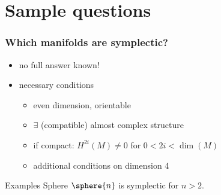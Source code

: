\section{Sample questions}

\begin{frame}
  \frametitle{Which manifolds are symplectic?}
  \begin{itemize}
    \item no full answer known! %
    \item necessary conditions
    \begin{itemize}
      \item even dimension, orientable %
      \item $\exists$ (compatible) almost complex structure
      \item if compact: $H^{2i}(M)\neq 0$ for $0 < 2i < \dim(M)$
      \item additional conditions on dimension 4 %
    \end{itemize}
  \end{itemize}
  \begin{block}{Examples}
    Sphere $\sphere{n}$ is  symplectic for $n>2$. %
  \end{block}

\end{frame}

